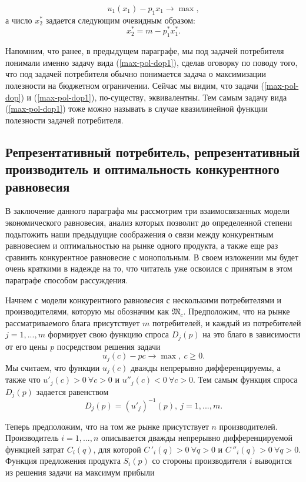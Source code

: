 \begin{equation}
\label{max-pol-dop1}
    u_{1}(x_{1})-p_{1}x_{1}\rightarrow\max,
\end{equation}
    а число $x_{2}^{*}$ задается следующим очевидным образом:
    \[x_{2}^{*}=m-p^{*}_{1}x^{*}_{1}.\]

    Напомним, что ранее, в предыдущем параграфе, мы под задачей
    потребителя понимали именно задачу вида (\ref{max-pol-dop1}),
    сделав оговорку по поводу того, что под задачей
    потребителя обычно понимается задача о максимизации полезности
    на бюджетном ограничении. Сейчас мы видим, что задачи
    (\ref{max-pol-dop}) и (\ref{max-pol-dop1}), по-существу, эквивалентны. Тем самым
    задачу вида (\ref{max-pol-dop1}) тоже можно называть в случае квазилинейной
    функции полезности задачей потребителя.


\subsection{Репрезентативный потребитель,
репрезентативный производитель и оптимальность конкурентного равновесия}


    В заключение данного параграфа мы рассмотрим три взаимосвязанных модели
    экономического равновесия, анализ которых позволит до
    определенной степени подытожить наши предыдущие соображения о связи между
    конкурентным  равновесием и оптимальностью на рынке одного
    продукта, а также еще раз сравнить конкурентное равновесие с
    монопольным. В своем изложении мы будет очень краткими
    в надежде на то, что читатель
    уже освоился с принятым в этом параграфе способом  рассуждения.

    Начнем с модели конкурентного равновесия с несколькими
    потребителями и производителями, которую мы обозначим как
    $\mathfrak{M}_{c}$.
    Предположим, что на рынке рассматриваемого блага присутствует $m$
    потребителей, и каждый из потребителей $j=1,...,m$ формирует свою функцию
    спроса $D_{j}(p)$ на это благо
    в зависимости от его цены $p$ посредством решения задачи
    \[u_{j}(c)-pc\rightarrow\max, \ c\geqslant0.\]
    Мы считаем, что функции $u_{j}(c)$ дважды непрерывно дифференцируемы,
    а также что $u'_{j}(c)>0 \ \forall c>0$ и $u''_{j}(c)<0 \ \forall c>0$. Тем самым
    функция спроса $D_{j}(p)$ задается равенством
    \[D_{j}(p)=(u'_{j})^{-1}(p), \ j=1,...,m.\]




    Теперь предположим, что на том же рынке присутствует $n$
    производителей. Производитель $i=1,...,n$ описывается дважды непрерывно
    дифференцируемой функцией затрат $C_{i}(q)$, для которой
    $C\,'_{i}(q)>0 \ \forall q>0$ и $C\,''_{i}(q)>0 \ \forall q>0$.
    Функция предложения продукта $S_{i}(p)$ со стороны производителя
    $i$ выводится из решения задачи на максимум прибыли

